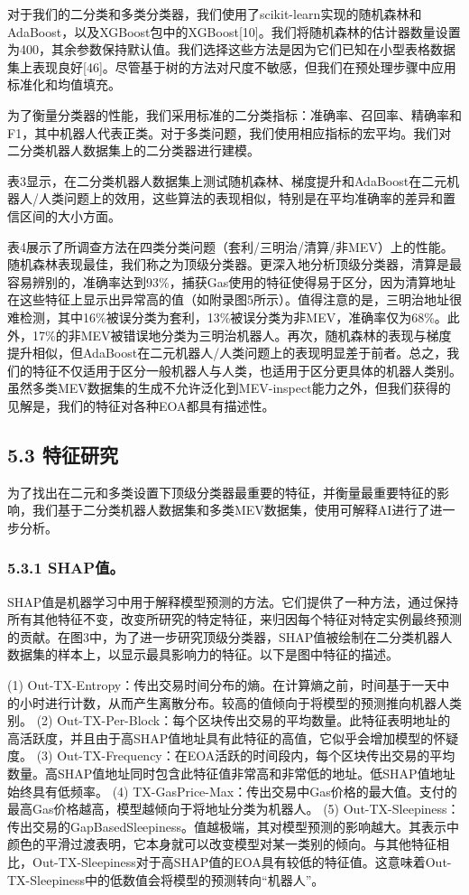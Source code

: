 对于我们的二分类和多类分类器，我们使用了scikit-learn实现的随机森林和AdaBoost，以及XGBoost包中的XGBoost[10]。我们将随机森林的估计器数量设置为400，其余参数保持默认值。我们选择这些方法是因为它们已知在小型表格数据集上表现良好[46]。尽管基于树的方法对尺度不敏感，但我们在预处理步骤中应用标准化和均值填充。

为了衡量分类器的性能，我们采用标准的二分类指标：准确率、召回率、精确率和F1，其中机器人代表正类。对于多类问题，我们使用相应指标的宏平均。我们对二分类机器人数据集上的二分类器进行建模。

表3显示，在二分类机器人数据集上测试随机森林、梯度提升和AdaBoost在二元机器人/人类问题上的效用，这些算法的表现相似，特别是在平均准确率的差异和置信区间的大小方面。

表4展示了所调查方法在四类分类问题（套利/三明治/清算/非MEV）上的性能。随机森林表现最佳，我们称之为顶级分类器。更深入地分析顶级分类器，清算是最容易辨别的，准确率达到93\%，捕获Gas使用的特征使得易于区分，因为清算地址在这些特征上显示出异常高的值（如附录图5所示）。值得注意的是，三明治地址很难检测，其中16\%被误分类为套利，13\%被误分类为非MEV，准确率仅为68\%。此外，17\%的非MEV被错误地分类为三明治机器人。再次，随机森林的表现与梯度提升相似，但AdaBoost在二元机器人/人类问题上的表现明显差于前者。总之，我们的特征不仅适用于区分一般机器人与人类，也适用于区分更具体的机器人类别。虽然多类MEV数据集的生成不允许泛化到MEV-inspect能力之外，但我们获得的见解是，我们的特征对各种EOA都具有描述性。

\subsection*{5.3 特征研究}

为了找出在二元和多类设置下顶级分类器最重要的特征，并衡量最重要特征的影响，我们基于二分类机器人数据集和多类MEV数据集，使用可解释AI进行了进一步分析。

\subsubsection*{5.3.1 SHAP值。} SHAP值是机器学习中用于解释模型预测的方法。它们提供了一种方法，通过保持所有其他特征不变，改变所研究的特定特征，来归因每个特征对特定实例最终预测的贡献。在图3中，为了进一步研究顶级分类器，SHAP值被绘制在二分类机器人数据集的样本上，以显示最具影响力的特征。以下是图中特征的描述。

(1) Out-TX-Entropy：传出交易时间分布的熵。在计算熵之前，时间基于一天中的小时进行计数，从而产生离散分布。较高的值倾向于将模型的预测推向机器人类别。
(2) Out-TX-Per-Block：每个区块传出交易的平均数量。此特征表明地址的高活跃度，并且由于高SHAP值地址具有此特征的高值，它似乎会增加模型的怀疑度。
(3) Out-TX-Frequency：在EOA活跃的时间段内，每个区块传出交易的平均数量。高SHAP值地址同时包含此特征值非常高和非常低的地址。低SHAP值地址始终具有低频率。
(4) TX-GasPrice-Max：传出交易中Gas价格的最大值。支付的最高Gas价格越高，模型越倾向于将地址分类为机器人。
(5) Out-TX-Sleepiness：传出交易的GapBasedSleepiness。值越极端，其对模型预测的影响越大。其表示中颜色的平滑过渡表明，它本身就可以改变模型对某一类别的倾向。与其他特征相比，Out-TX-Sleepiness对于高SHAP值的EOA具有较低的特征值。这意味着Out-TX-Sleepiness中的低数值会将模型的预测转向“机器人”。


